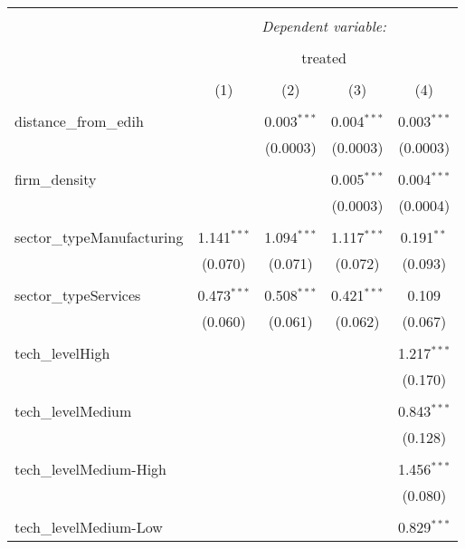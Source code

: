 \documentclass{article}
\begin{document}
 
 \begin{table}[!htbp] \centering 
   \caption{} 
   \label{} 
 \begin{tabular}{@{\extracolsep{5pt}}lcccc} 
 \\[-1.8ex]\hline 
 \hline \\[-1.8ex] 
  & \multicolumn{4}{c}{\textit{Dependent variable:}} \\ 
 \cline{2-5} 
 \\[-1.8ex] & \multicolumn{4}{c}{treated} \\ 
 \\[-1.8ex] & (1) & (2) & (3) & (4)\\ 
 \hline \\[-1.8ex] 
  distance\_from\_edih &  & 0.003$^{***}$ & 0.004$^{***}$ & 0.003$^{***}$ \\ 
   &  & (0.0003) & (0.0003) & (0.0003) \\ 
   & & & & \\ 
  firm\_density &  &  & 0.005$^{***}$ & 0.004$^{***}$ \\ 
   &  &  & (0.0003) & (0.0004) \\ 
   & & & & \\ 
  sector\_typeManufacturing & 1.141$^{***}$ & 1.094$^{***}$ & 1.117$^{***}$ & 0.191$^{**}$ \\ 
   & (0.070) & (0.071) & (0.072) & (0.093) \\ 
   & & & & \\ 
  sector\_typeServices & 0.473$^{***}$ & 0.508$^{***}$ & 0.421$^{***}$ & 0.109 \\ 
   & (0.060) & (0.061) & (0.062) & (0.067) \\ 
   & & & & \\ 
  tech\_levelHigh &  &  &  & 1.217$^{***}$ \\ 
   &  &  &  & (0.170) \\ 
   & & & & \\ 
  tech\_levelMedium &  &  &  & 0.843$^{***}$ \\ 
   &  &  &  & (0.128) \\ 
   & & & & \\ 
  tech\_levelMedium-High &  &  &  & 1.456$^{***}$ \\ 
   &  &  &  & (0.080) \\ 
   & & & & \\ 
  tech\_levelMedium-Low &  &  &  & 0.829$^{***}$ \\ 

\end{tabular}
\end{table}
\end{document}
